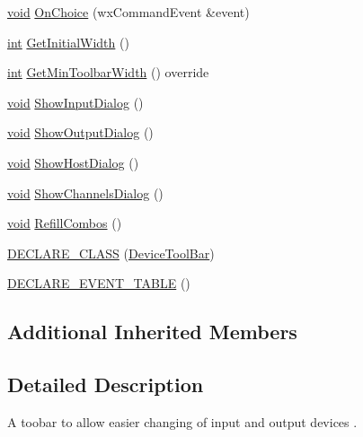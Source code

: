 \begin{DoxyCompactItemize}
\item 
\hyperlink{sound_8c_ae35f5844602719cf66324f4de2a658b3}{void} \hyperlink{class_device_tool_bar_ad8545f94b0c0f69a8a1f4f6daa9c50e3}{On\+Choice} (wx\+Command\+Event \&event)
\item 
\hyperlink{xmltok_8h_a5a0d4a5641ce434f1d23533f2b2e6653}{int} \hyperlink{class_device_tool_bar_aa79c20ff5e08b797b2b4c012c36ce765}{Get\+Initial\+Width} ()
\item 
\hyperlink{xmltok_8h_a5a0d4a5641ce434f1d23533f2b2e6653}{int} \hyperlink{class_device_tool_bar_a833a29fe8a7c8cc834ff9ff9f93d81d8}{Get\+Min\+Toolbar\+Width} () override
\item 
\hyperlink{sound_8c_ae35f5844602719cf66324f4de2a658b3}{void} \hyperlink{class_device_tool_bar_a78d11b781dd170d1147a878f186c793e}{Show\+Input\+Dialog} ()
\item 
\hyperlink{sound_8c_ae35f5844602719cf66324f4de2a658b3}{void} \hyperlink{class_device_tool_bar_a1c86155bb841d8f0230aa23fc227f232}{Show\+Output\+Dialog} ()
\item 
\hyperlink{sound_8c_ae35f5844602719cf66324f4de2a658b3}{void} \hyperlink{class_device_tool_bar_af46a0891acd9b97ebe02b2ab23bc9106}{Show\+Host\+Dialog} ()
\item 
\hyperlink{sound_8c_ae35f5844602719cf66324f4de2a658b3}{void} \hyperlink{class_device_tool_bar_a21e083384426a3dcccf2f3488d105c5c}{Show\+Channels\+Dialog} ()
\item 
\hyperlink{sound_8c_ae35f5844602719cf66324f4de2a658b3}{void} \hyperlink{class_device_tool_bar_afbfe5c5f27e9ba230c418d07e85fd68a}{Refill\+Combos} ()
\item 
\hyperlink{class_device_tool_bar_aacbe6e1644addd887f0c497e4c21b02e}{D\+E\+C\+L\+A\+R\+E\+\_\+\+C\+L\+A\+SS} (\hyperlink{class_device_tool_bar}{Device\+Tool\+Bar})
\item 
\hyperlink{class_device_tool_bar_ad65bbe2b6e4261107cc43ca5dc0e9c27}{D\+E\+C\+L\+A\+R\+E\+\_\+\+E\+V\+E\+N\+T\+\_\+\+T\+A\+B\+LE} ()
\end{DoxyCompactItemize}
\subsection*{Additional Inherited Members}


\subsection{Detailed Description}
A toobar to allow easier changing of input and output devices . 

